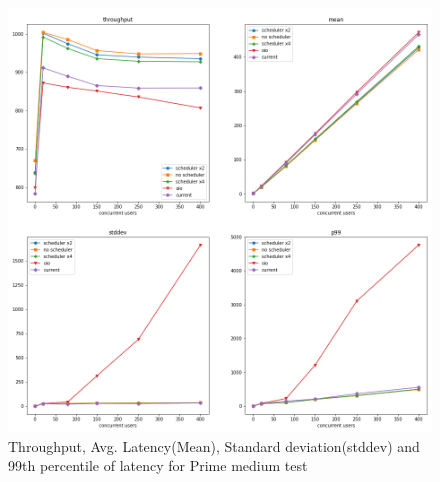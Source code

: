 \begin{figure}[htbp]
	\begin{center}
		\includegraphics[scale=0.5]{figures/prime_medium test results.png}
	\end{center}
	\caption{Throughput, Avg. Latency(Mean), Standard deviation(stddev) and 99th percentile of latency for Prime medium test }
	\label{phase-1-prime-medium-all-architectures}
\end{figure}

